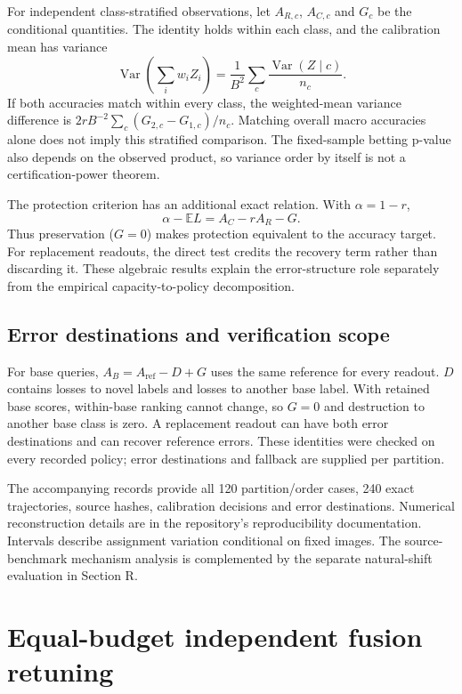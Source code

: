 \documentclass[preprint,review,12pt]{elsarticle}
\begin{document}
For independent class-stratified observations, let $A_{R,c}$, $A_{C,c}$ and $G_c$ be the conditional quantities. The identity holds within each class, and the calibration mean has variance
\begin{equation}
 \operatorname{Var}\!\left(\sum_i w_i Z_i\right)=\frac{1}{B^2}\sum_c\frac{\operatorname{Var}(Z\mid c)}{n_c}.
\end{equation}
If both accuracies match within every class, the weighted-mean variance difference is $2r B^{-2}\sum_c(G_{2,c}-G_{1,c})/n_c$. Matching overall macro accuracies alone does not imply this stratified comparison. The fixed-sample betting p-value also depends on the observed product, so variance order by itself is not a certification-power theorem.

The protection criterion has an additional exact relation. With $\alpha=1-r$,
\begin{equation}
 \alpha-\mathbb E L=A_C-rA_R-G.
\end{equation}
Thus preservation ($G=0$) makes protection equivalent to the accuracy target. For replacement readouts, the direct test credits the recovery term rather than discarding it. These algebraic results explain the error-structure role separately from the empirical capacity-to-policy decomposition.

\subsection{Error destinations and verification scope}
For base queries, $A_B=A_{\mathrm{ref}}-D+G$ uses the same reference for every readout. $D$ contains losses to novel labels and losses to another base label. With retained base scores, within-base ranking cannot change, so $G=0$ and destruction to another base class is zero. A replacement readout can have both error destinations and can recover reference errors. These identities were checked on every recorded policy; error destinations and fallback are supplied per partition.

The accompanying records provide all 120 partition/order cases, 240 exact trajectories, source hashes, calibration decisions and error destinations. Numerical reconstruction details are in the repository's reproducibility documentation. Intervals describe assignment variation conditional on fixed images. The source-benchmark mechanism analysis is complemented by the separate natural-shift evaluation in Section R.


\FloatBarrier
\section{Equal-budget independent fusion retuning}
\label{app:fullretuning}
\end{document}
